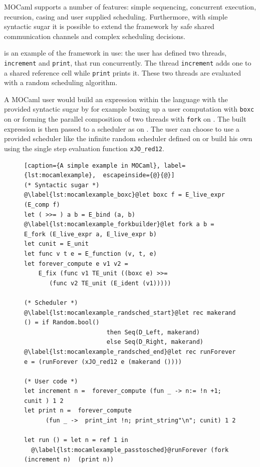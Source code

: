 \documentclass[12pt,twoside,notitlepage]{report}
\theoremstyle{plain}%
\theoremstyle{definition}
\theoremstyle{remark}
\begin{document}
MOCaml supports a number of features: simple sequencing, concurrent execution, recursion, casing and user supplied scheduling. Furthermore, with simple syntactic sugar it is possible to extend the framework by safe shared communication channels and complex scheduling decisions. 

 is an example of the framework in use:  the user has defined two threads, \lstinline|increment| and \lstinline|print|, that run concurrently. The thread  \lstinline|increment| adds one to a shared reference cell while \lstinline|print| prints it. These two threads are evaluated with a random scheduling algorithm.

A MOCaml user would build an expression within the language with the provided syntactic sugar by for example boxing up a user computation with \lstinline|boxc| on  or forming the parallel composition of two threads with \lstinline|fork| on . The built expression is then passed to a scheduler as on . The user can choose to use a provided scheduler like the infinite random scheduler defined on  or build his own using the single step evaluation function \lstinline|xJO_red12|.
\begin{figure}[H]
\centering
\begin{lstlisting}[caption={A simple example in MOCaml}, label={lst:mocamlexample},  escapeinside={@}{@}]
(* Syntactic sugar *)
@\label{lst:mocamlexample_boxc}@let boxc f = E_live_expr (E_comp f)
let ( >>= ) a b = E_bind (a, b)
@\label{lst:mocamlexample_forkbuilder}@let fork a b = E_fork (E_live_expr a, E_live_expr b)
let cunit = E_unit
let func v t e = E_function (v, t, e)
let forever_compute e v1 v2 = 
    E_fix (func v1 TE_unit ((boxc e) >>= 
       (func v2 TE_unit (E_ident (v1)))))

(* Scheduler *)
@\label{lst:mocamlexample_randsched_start}@let rec makerand () = if Random.bool() 
                       then Seq(D_Left, makerand) 
                       else Seq(D_Right, makerand)
@\label{lst:mocamlexample_randsched_end}@let rec runForever e = (runForever (xJO_red12 e (makerand ())))

(* User code *)
let increment n =  forever_compute (fun _ -> n:= !n +1; cunit ) 1 2
let print n =  forever_compute 
      (fun _ ->  print_int !n; print_string"\n"; cunit) 1 2 

let run () = let n = ref 1 in
  @\label{lst:mocamlexample_passtosched}@runForever (fork (increment n)  (print n))
\end{lstlisting}
\end{figure}
\end{document}
